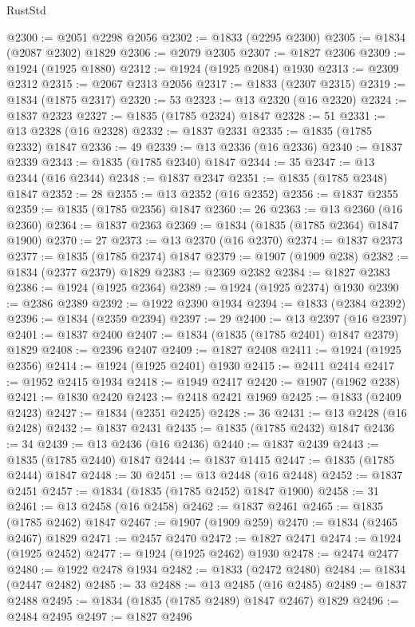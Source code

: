 \begin{lexlean}{RustStd}
\begin{coremodule}
@2300 := @2051 @2298 @2056
@2302 := @1833 (@2295 @2300)
@2305 := @1834 (@2087 @2302) @1829
@2306 := @2079 @2305
@2307 := @1827 @2306
@2309 := @1924 (@1925 @1880)
@2312 := @1924 (@1925 @2084) @1930
@2313 := @2309 @2312
@2315 := @2067 @2313 @2056
@2317 := @1833 (@2307 @2315)
@2319 := @1834 (@1875 @2317)
@2320 := 53
@2323 := @13 @2320 (@16 @2320)
@2324 := @1837 @2323
@2327 := @1835 (@1785 @2324) @1847
@2328 := 51
@2331 := @13 @2328 (@16 @2328)
@2332 := @1837 @2331
@2335 := @1835 (@1785 @2332) @1847
@2336 := 49
@2339 := @13 @2336 (@16 @2336)
@2340 := @1837 @2339
@2343 := @1835 (@1785 @2340) @1847
@2344 := 35
@2347 := @13 @2344 (@16 @2344)
@2348 := @1837 @2347
@2351 := @1835 (@1785 @2348) @1847
@2352 := 28
@2355 := @13 @2352 (@16 @2352)
@2356 := @1837 @2355
@2359 := @1835 (@1785 @2356) @1847
@2360 := 26
@2363 := @13 @2360 (@16 @2360)
@2364 := @1837 @2363
@2369 := @1834 (@1835 (@1785 @2364) @1847 @1900)
@2370 := 27
@2373 := @13 @2370 (@16 @2370)
@2374 := @1837 @2373
@2377 := @1835 (@1785 @2374) @1847
@2379 := @1907 (@1909 @238)
@2382 := @1834 (@2377 @2379) @1829
@2383 := @2369 @2382
@2384 := @1827 @2383
@2386 := @1924 (@1925 @2364)
@2389 := @1924 (@1925 @2374) @1930
@2390 := @2386 @2389
@2392 := @1922 @2390 @1934
@2394 := @1833 (@2384 @2392)
@2396 := @1834 (@2359 @2394)
@2397 := 29
@2400 := @13 @2397 (@16 @2397)
@2401 := @1837 @2400
@2407 := @1834 (@1835 (@1785 @2401) @1847 @2379) @1829
@2408 := @2396 @2407
@2409 := @1827 @2408
@2411 := @1924 (@1925 @2356)
@2414 := @1924 (@1925 @2401) @1930
@2415 := @2411 @2414
@2417 := @1952 @2415 @1934
@2418 := @1949 @2417
@2420 := @1907 (@1962 @238)
@2421 := @1830 @2420
@2423 := @2418 @2421 @1969
@2425 := @1833 (@2409 @2423)
@2427 := @1834 (@2351 @2425)
@2428 := 36
@2431 := @13 @2428 (@16 @2428)
@2432 := @1837 @2431
@2435 := @1835 (@1785 @2432) @1847
@2436 := 34
@2439 := @13 @2436 (@16 @2436)
@2440 := @1837 @2439
@2443 := @1835 (@1785 @2440) @1847
@2444 := @1837 @1415
@2447 := @1835 (@1785 @2444) @1847
@2448 := 30
@2451 := @13 @2448 (@16 @2448)
@2452 := @1837 @2451
@2457 := @1834 (@1835 (@1785 @2452) @1847 @1900)
@2458 := 31
@2461 := @13 @2458 (@16 @2458)
@2462 := @1837 @2461
@2465 := @1835 (@1785 @2462) @1847
@2467 := @1907 (@1909 @259)
@2470 := @1834 (@2465 @2467) @1829
@2471 := @2457 @2470
@2472 := @1827 @2471
@2474 := @1924 (@1925 @2452)
@2477 := @1924 (@1925 @2462) @1930
@2478 := @2474 @2477
@2480 := @1922 @2478 @1934
@2482 := @1833 (@2472 @2480)
@2484 := @1834 (@2447 @2482)
@2485 := 33
@2488 := @13 @2485 (@16 @2485)
@2489 := @1837 @2488
@2495 := @1834 (@1835 (@1785 @2489) @1847 @2467) @1829
@2496 := @2484 @2495
@2497 := @1827 @2496

\end{coremodule}
\end{lexlean}
